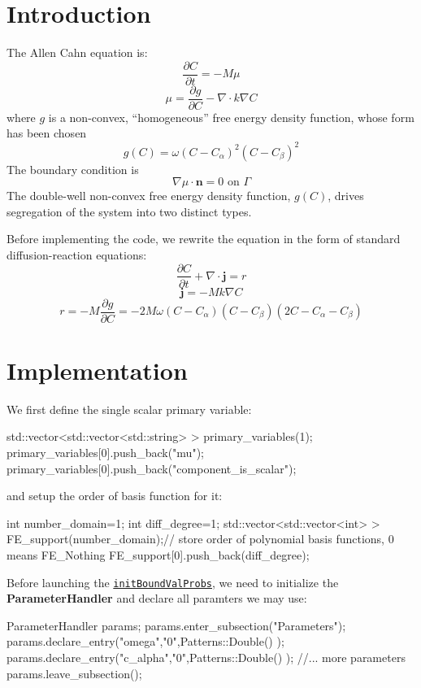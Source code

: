 \hypertarget{growth_Introduction}{}\section{Introduction}\label{growth_Introduction}
The Allen Cahn equation is\-: \[ \frac{\partial C}{\partial t}=-M\mu \] \[ \mu=\frac{\partial g}{\partial C}-\nabla\cdot k\nabla C \] where $g$ is a non-\/convex, ``homogeneous'' free energy density function, whose form has been chosen \[ g(C)=\omega(C-C_\alpha)^2(C-C_\beta)^2 \] The boundary condition is \[ \nabla \mu\cdot\boldsymbol{n}=0 \text{ on }\Gamma \] The double-\/well non-\/convex free energy density function, $g(C)$, drives segregation of the system into two distinct types.

Before implementing the code, we rewrite the equation in the form of standard diffusion-\/reaction equations\-: \[ \frac{\partial C}{\partial t}+\nabla\cdot\boldsymbol{j}=r \] \[ \boldsymbol{j}=-Mk\nabla C \] \[ r=-M\frac{\partial g}{\partial C}=-2M\omega(C-C_\alpha)(C-C_\beta)(2C-C_\alpha-C_\beta) \]\hypertarget{growth_imple}{}\section{Implementation}\label{growth_imple}
We first define the single scalar primary variable\-: 
\begin{DoxyCode}
  std::vector<std::vector<std::string> > primary\_variables(1);        
primary\_variables[0].push\_back(\textcolor{stringliteral}{"mu"}); primary\_variables[0].push\_back(\textcolor{stringliteral}{"component\_is\_scalar"});
\end{DoxyCode}
 and setup the order of basis function for it\-: 
\begin{DoxyCode}
\textcolor{keywordtype}{int} number\_domain=1;
\textcolor{keywordtype}{int} diff\_degree=1;
std::vector<std::vector<int> > FE\_support(number\_domain);\textcolor{comment}{// store order of polynomial basis functions, 0
       means FE\_Nothing   }
FE\_support[0].push\_back(diff\_degree);
\end{DoxyCode}
 Before launching the \href{../html/classinit_bound_val_probs.html}{\tt init\-Bound\-Val\-Probs}, we need to initialize the {\bfseries Parameter\-Handler} and declare all paramters we may use\-: 
\begin{DoxyCode}
ParameterHandler params;
params.enter\_subsection(\textcolor{stringliteral}{"Parameters"});  
params.declare\_entry(\textcolor{stringliteral}{"omega"},\textcolor{stringliteral}{"0"},Patterns::Double() );
params.declare\_entry(\textcolor{stringliteral}{"c\_alpha"},\textcolor{stringliteral}{"0"},Patterns::Double() );
\textcolor{comment}{//... more parameters }
params.leave\_subsection();  
\end{DoxyCode}
